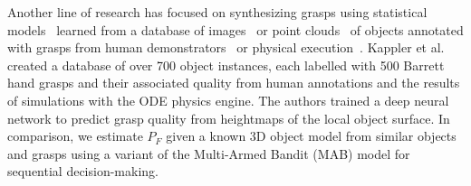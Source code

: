 Another line of research has focused on synthesizing grasps using statistical models~\cite{bohg2014data} learned from a database of images~\cite{lenz2015deep} or point clouds~\cite{detry2013learning, herzog2014learning, zhang2011graspable} of objects annotated with grasps from human demonstrators~\cite{herzog2014learning, lenz2015deep} or physical execution~\cite{herzog2014learning}.
Kappler et al.~\cite{kappler2015leveraging} created a database of over 700 object instances, each labelled with 500 Barrett hand grasps and their associated quality from human annotations and the results of simulations with the ODE physics engine.
The authors trained a deep neural network to predict grasp quality from heightmaps of the local object surface.
In comparison, we estimate $P_F$ given a known 3D object model from similar objects and grasps using a variant of the Multi-Armed Bandit (MAB) model for sequential decision-making.

